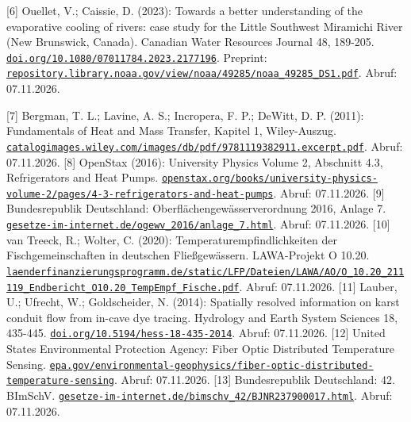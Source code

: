 \begin{description}[leftmargin=8mm,labelsep=2mm]
 [6] \begingroup{} Ouellet, V.; Caissie, D. (2023): Towards a better understanding of the evaporative cooling of rivers: case study for the Little Southwest Miramichi River (New Brunswick, Canada). Canadian Water Resources Journal 48, 189-205. \href{https://doi.org/10.1080/07011784.2023.2177196}{\nolinkurl{doi.org/10.1080/07011784.2023.2177196}}. Preprint: \href{https://repository.library.noaa.gov/view/noaa/49285/noaa_49285_DS1.pdf}{\nolinkurl{repository.library.noaa.gov/view/noaa/49285/noaa_49285_DS1.pdf}}. Abruf: 07.11.2026.\par\endgroup
{} [7] Bergman, T. L.; Lavine, A. S.; Incropera, F. P.; DeWitt, D. P. (2011): Fundamentals of Heat and Mass Transfer, Kapitel 1, Wiley-Auszug. \href{https://catalogimages.wiley.com/images/db/pdf/9781119382911.excerpt.pdf}{\nolinkurl{catalogimages.wiley.com/images/db/pdf/9781119382911.excerpt.pdf}}. Abruf: 07.11.2026.
 [8] OpenStax (2016): University Physics Volume 2, Abschnitt 4.3, Refrigerators and Heat Pumps. \href{https://openstax.org/books/university-physics-volume-2/pages/4-3-refrigerators-and-heat-pumps}{\nolinkurl{openstax.org/books/university-physics-volume-2/pages/4-3-refrigerators-and-heat-pumps}}. Abruf: 07.11.2026.
 [9] Bundesrepublik Deutschland: Oberflächengewässerverordnung 2016, Anlage 7. \href{https://www.gesetze-im-internet.de/ogewv_2016/anlage_7.html}{\nolinkurl{gesetze-im-internet.de/ogewv_2016/anlage_7.html}}. Abruf: 07.11.2026.
 [10] van Treeck, R.; Wolter, C. (2020): Temperaturempfindlichkeiten der Fischgemeinschaften in deutschen Fließgewässern. LAWA-Projekt O 10.20. \href{https://www.laenderfinanzierungsprogramm.de/static/LFP/Dateien/LAWA/AO/O_10.20_211119_Endbericht_O10.20_TempEmpf_Fische.pdf}{\nolinkurl{laenderfinanzierungsprogramm.de/static/LFP/Dateien/LAWA/AO/O_10.20_211119_Endbericht_O10.20_TempEmpf_Fische.pdf}}. Abruf: 07.11.2026.
 [11] Lauber, U.; Ufrecht, W.; Goldscheider, N. (2014): Spatially resolved information on karst conduit flow from in-cave dye tracing. Hydrology and Earth System Sciences 18, 435-445. \href{https://doi.org/10.5194/hess-18-435-2014}{\nolinkurl{doi.org/10.5194/hess-18-435-2014}}. Abruf: 07.11.2026.
 [12] United States Environmental Protection Agency: Fiber Optic Distributed Temperature Sensing. \href{https://www.epa.gov/environmental-geophysics/fiber-optic-distributed-temperature-sensing}{\nolinkurl{epa.gov/environmental-geophysics/fiber-optic-distributed-temperature-sensing}}. Abruf: 07.11.2026.
 [13] Bundesrepublik Deutschland: 42. BImSchV. \href{https://www.gesetze-im-internet.de/bimschv_42/BJNR237900017.html}{\nolinkurl{gesetze-im-internet.de/bimschv_42/BJNR237900017.html}}. Abruf: 07.11.2026.

\end{description}
